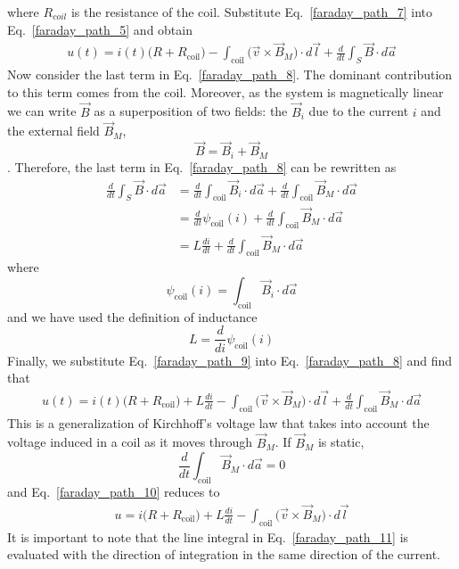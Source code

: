 \documentclass[12pt,a4paper,oneside]{book}
\begin{document}
\begin{onehalfspace}
where $R_{coil}$ is the resistance of the coil. Substitute Eq.~\eqref{faraday_path_7} into Eq.~\eqref{faraday_path_5} and obtain
 \begin{equation}\label{faraday_path_8}
	\begin{aligned}
		u(t) = i(t)\big(R+R_{\text{coil}}\big)-\int_{\text{coil}}\big(\vec{v}\times\vec{B}_M\big)\cdot d\vec{l} + \frac{d}{dt}\int_S\vec{B}\cdot d\vec{a}
	\end{aligned}
\end{equation} 
Now consider the last term in Eq.~\eqref{faraday_path_8}. The dominant contribution to this term comes from the coil. Moreover, as the system is magnetically linear we can write $\vec{B}$ as a superposition of two fields: the $\vec{B}_i$ due to the current $i$ and the external field $\vec{B}_M$, $$ \vec{B}=\vec{B}_i+\vec{B}_M$$. Therefore, the last term in Eq.~\eqref{faraday_path_8} can be rewritten as
 \begin{equation}\label{faraday_path_9}
	\begin{aligned}
		\frac{d}{dt}\int_S\vec{B}\cdot d\vec{a} &= \frac{d}{dt}\int_{\text{coil}}\vec{B}_i\cdot d\vec{a} + \frac{d}{dt}\int_{\text{coil}}\vec{B}_M\cdot d\vec{a}  \\[8pt]
		&= \frac{d}{dt} \psi_{\text{coil}}(i) + \frac{d}{dt}\int_{\text{coil}}\vec{B}_M\cdot d\vec{a} \\[8pt]
		&= L\frac{di}{dt} + \frac{d}{dt}\int_{\text{coil}}\vec{B}_M\cdot d\vec{a}
	\end{aligned}
\end{equation} 
where $$\psi_{\text{coil}}(i)=\int_{\text{coil}}\vec{B}_i\cdot d\vec{a}$$ and we have used the definition of inductance $$L=\frac{d}{di} \psi_{\text{coil}}(i)$$
Finally, we substitute Eq.~\eqref{faraday_path_9} into Eq.~\eqref{faraday_path_8} and find that
 \begin{equation}\label{faraday_path_10}
	\begin{aligned}
		u(t) = i(t)\big(R+R_{\text{coil}}\big)+L\frac{di}{dt}-\int_{\text{coil}}\big(\vec{v}\times\vec{B}_M\big)\cdot d\vec{l} + \frac{d}{dt}\int_{\text{coil}}\vec{B}_M\cdot d\vec{a}
	\end{aligned}
\end{equation} 
This is a generalization of Kirchhoff's voltage law that takes into account the voltage induced in a coil as it moves through $\vec{B}_M$. If $\vec{B}_M$ is static, $$\frac{d}{dt}\int_{\text{coil}}\vec{B}_M\cdot d\vec{a}=0$$ and Eq.~\eqref{faraday_path_10} reduces to 
  \begin{equation}\label{faraday_path_11}
 	\begin{aligned}
 		u = i\big(R+R_{\text{coil}}\big)+L\frac{di}{dt}-\int_{\text{coil}}\big(\vec{v}\times\vec{B}_M\big)\cdot d\vec{l}
 	\end{aligned}
 \end{equation} 
It is important to note that the line integral in Eq.~\eqref{faraday_path_11} is evaluated with the direction of integration in the same direction of the current.


\end{onehalfspace}
\end{document}
